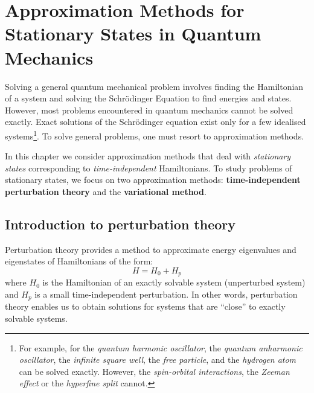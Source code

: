 \section{Approximation Methods for Stationary States in Quantum Mechanics}

Solving a general quantum mechanical problem involves finding the Hamiltonian of a system and solving the Schrödinger Equation to find energies and states. However, most problems encountered in quantum mechanics cannot be solved exactly. Exact solutions of the Schrödinger equation exist only for a few idealised systems\footnote{For example, for the \textit{quantum harmonic oscillator}, the \textit{quantum anharmonic oscillator}, the \textit{infinite square well}, the \textit{free particle}, and the \textit{hydrogen atom} can be solved exactly. However, the \textit{spin-orbital interactions}, the \textit{Zeeman effect} or the \textit{hyperfine split} cannot.}. To solve general problems, one must resort to approximation methods.

In this chapter we consider approximation methods that deal with \textit{stationary states} corresponding to \textit{time-independent} Hamiltonians. To study problems of stationary states, we focus on two approximation methods: \textbf{time-independent perturbation theory} and the \textbf{variational method}.

\subsection{Introduction to perturbation theory}

Perturbation theory provides a method to approximate energy eigenvalues and eigenstates of Hamiltonians of the form:
\begin{equation}
    H = H_0 + H_p
\end{equation}
where $H_0$ is the Hamiltonian of an exactly solvable system (unperturbed system) and $H_p$ is a small time-independent perturbation. In other words, perturbation theory enables us to obtain solutions for systems that are ``close'' to exactly solvable systems.

